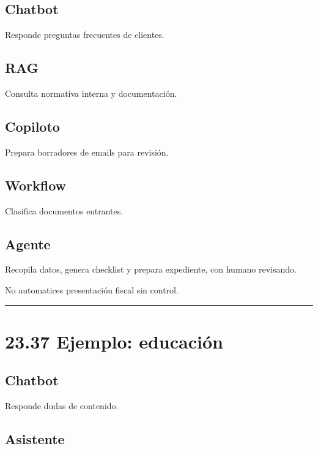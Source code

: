 \subsection{Chatbot}\label{chatbot-7}

Responde preguntas frecuentes de clientes.

\subsection{RAG}\label{rag-4}

Consulta normativa interna y documentación.

\subsection{Copiloto}\label{copiloto-6}

Prepara borradores de emails para revisión.

\subsection{Workflow}\label{workflow-6}

Clasifica documentos entrantes.

\subsection{Agente}\label{agente-7}

Recopila datos, genera checklist y prepara expediente, con humano
revisando.

No automatices presentación fiscal sin control.

\begin{center}\rule{0.5\linewidth}{0.5pt}\end{center}

\section{23.37 Ejemplo: educación}\label{ejemplo-educaciuxf3n}

\subsection{Chatbot}\label{chatbot-8}

Responde dudas de contenido.

\subsection{Asistente}\label{asistente-3}

